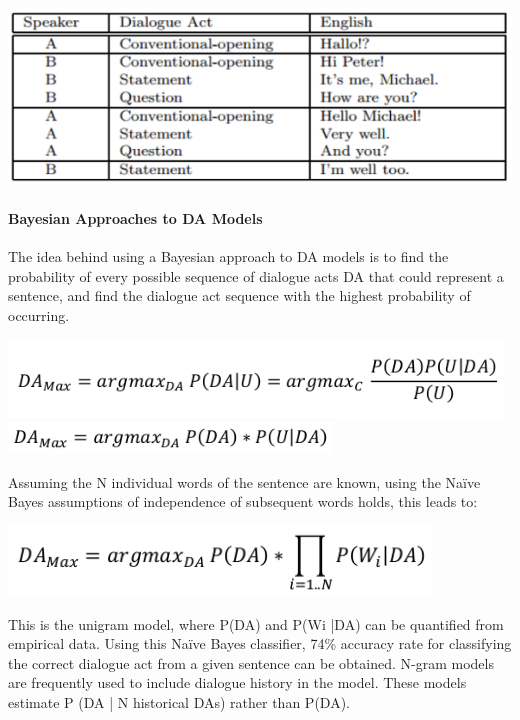 \includegraphics[width=\linewidth]{1.png}


\paragraph{Bayesian Approaches to DA Models}

The idea behind using a Bayesian approach to DA models is to find the
probability of every possible sequence of dialogue acts DA that could represent
a sentence, and find the dialogue act sequence with the highest probability of
occurring.

\includegraphics[width=\linewidth]{2.png}
\includegraphics[width=\linewidth]{3.png}

Assuming the N individual words of the sentence are known, using the Naïve Bayes
assumptions of independence of subsequent words holds, this leads to:

\includegraphics[width=\linewidth]{4.png}

This is the unigram model, where P(DA) and P(Wi |DA) can be quantified from
empirical data. Using this Naïve Bayes classifier, 74\% accuracy rate for
classifying the correct dialogue act from a given sentence can be obtained.
N-gram models are frequently used to include dialogue history in the model.
These models estimate P (DA | N historical DAs) rather than P(DA). 

